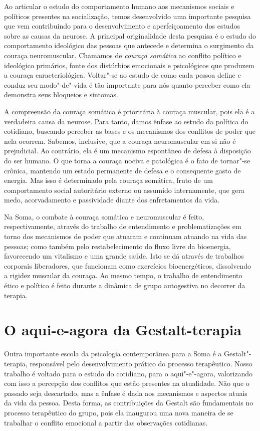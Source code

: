 Ao articular o estudo do comportamento humano aos mecanismos sociais e
políticos presentes na socialização, temos desenvolvido uma importante
pesquisa que vem contribuindo para o desenvolvimento e aperfeiçoamento
dos estudos sobre as causas da neurose. A principal originalidade desta
pesquisa é o estudo do comportamento ideológico das pessoas que antecede
e determina o surgimento da couraça neuromuscular. Chamamos de
\emph{couraça somática} ao conflito político e ideológico primários,
fonte dos distúrbios emocionais e psicológicos que produzem a couraça
caracteriológica. Voltar"-se ao estudo de como cada pessoa define e
conduz seu modo"-de"-vida é tão importante para nós quanto perceber como
ela demonstra seus bloqueios e sintomas.

A compreensão da couraça somática é prioritária à couraça muscular, pois
ela é a verdadeira causa da neurose. Para tanto, damos ênfase ao estudo
da política do cotidiano, buscando perceber as bases e os mecanismos dos
conflitos de poder que nela ocorrem. Sabemos, inclusive, que a couraça
neuromuscular em si não é prejudicial. Ao contrário, ela é um mecanismo
espontâneo de defesa à disposição do ser humano. O que torna a couraça
nociva e patológica é o fato de tornar"-se crônica, mantendo um estado
permanente de defesa e o consequente gasto de energia. Mas isso é
determinado pela couraça somática, fruto de um comportamento social
autoritário externo ou assumido internamente, que gera medo,
acorvadamento e passividade diante dos enfretamentos da vida.

Na Soma, o combate à couraça somática e neuromuscular é feito,
respectivamente, através do trabalho de entendimento e problematizações
em torno dos mecanismos de poder que atuaram e continuam atuando na vida
das pessoas; como também pelo restabelecimento do fluxo livre da
bioenergia, favorecendo um vitalismo e uma grande saúde. Isto se dá
através de trabalhos corporais liberadores, que funcionam como
exercícios bioenergéticos, dissolvendo a rigidez muscular da couraça. Ao
mesmo tempo, o trabalho de entendimento ético e político é feito
durante a dinâmica de grupo autogestiva no decorrer da terapia.

\section{O aqui-e-agora da Gestalt-terapia}

Outra importante escola da psicologia contemporânea para a Soma é a
Gestalt"-terapia, responsável pelo desenvolvimento prático do processo
terapêutico. Nosso trabalho é voltado para o estudo do cotidiano, para o
aqui"-e"-agora, valorizando com isso a percepção dos conflitos que estão
presentes na atualidade. Não que o passado seja descartado, mas a ênfase
é dada aos mecanismos e aspectos atuais da vida da pessoa. Desta forma,
as contribuições da Gestalt são fundamentais no processo terapêutico do
grupo, pois ela inaugurou uma nova maneira de se trabalhar o conflito
emocional a partir das observações cotidianas.

